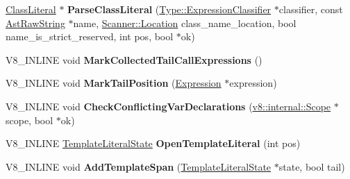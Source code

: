 \begin{DoxyCompactItemize}
\item 
\hyperlink{classv8_1_1internal_1_1_class_literal}{Class\+Literal} $\ast$ {\bfseries Parse\+Class\+Literal} (\hyperlink{classv8_1_1internal_1_1_expression_classifier}{Type\+::\+Expression\+Classifier} $\ast$classifier, const \hyperlink{classv8_1_1internal_1_1_ast_raw_string}{Ast\+Raw\+String} $\ast$name, \hyperlink{structv8_1_1internal_1_1_scanner_1_1_location}{Scanner\+::\+Location} class\+\_\+name\+\_\+location, bool name\+\_\+is\+\_\+strict\+\_\+reserved, int pos, bool $\ast$ok)\hypertarget{classv8_1_1internal_1_1_parser_traits_a4c76106215c61f83958c9d288ae8f8b7}{}\label{classv8_1_1internal_1_1_parser_traits_a4c76106215c61f83958c9d288ae8f8b7}

\item 
V8\+\_\+\+I\+N\+L\+I\+NE void {\bfseries Mark\+Collected\+Tail\+Call\+Expressions} ()\hypertarget{classv8_1_1internal_1_1_parser_traits_ae6b4bba1f1069ecbfe725f579bdd6b44}{}\label{classv8_1_1internal_1_1_parser_traits_ae6b4bba1f1069ecbfe725f579bdd6b44}

\item 
V8\+\_\+\+I\+N\+L\+I\+NE void {\bfseries Mark\+Tail\+Position} (\hyperlink{classv8_1_1internal_1_1_expression}{Expression} $\ast$expression)\hypertarget{classv8_1_1internal_1_1_parser_traits_a87d0d6479a981d8328822b7cafd100df}{}\label{classv8_1_1internal_1_1_parser_traits_a87d0d6479a981d8328822b7cafd100df}

\item 
V8\+\_\+\+I\+N\+L\+I\+NE void {\bfseries Check\+Conflicting\+Var\+Declarations} (\hyperlink{classv8_1_1internal_1_1_scope}{v8\+::internal\+::\+Scope} $\ast$scope, bool $\ast$ok)\hypertarget{classv8_1_1internal_1_1_parser_traits_a4b9edd9f74f476d66c2e8d86453a26b4}{}\label{classv8_1_1internal_1_1_parser_traits_a4b9edd9f74f476d66c2e8d86453a26b4}

\item 
V8\+\_\+\+I\+N\+L\+I\+NE \hyperlink{classv8_1_1internal_1_1_parser_traits_1_1_template_literal}{Template\+Literal\+State} {\bfseries Open\+Template\+Literal} (int pos)\hypertarget{classv8_1_1internal_1_1_parser_traits_a468e223ed6b4010334a027caae764c9d}{}\label{classv8_1_1internal_1_1_parser_traits_a468e223ed6b4010334a027caae764c9d}

\item 
V8\+\_\+\+I\+N\+L\+I\+NE void {\bfseries Add\+Template\+Span} (\hyperlink{classv8_1_1internal_1_1_parser_traits_1_1_template_literal}{Template\+Literal\+State} $\ast$state, bool tail)\hypertarget{classv8_1_1internal_1_1_parser_traits_a4ab3dc67e79f7bad8dee348cbae244e3}{}\label{classv8_1_1internal_1_1_parser_traits_a4ab3dc67e79f7bad8dee348cbae244e3}


\end{DoxyCompactItemize}
